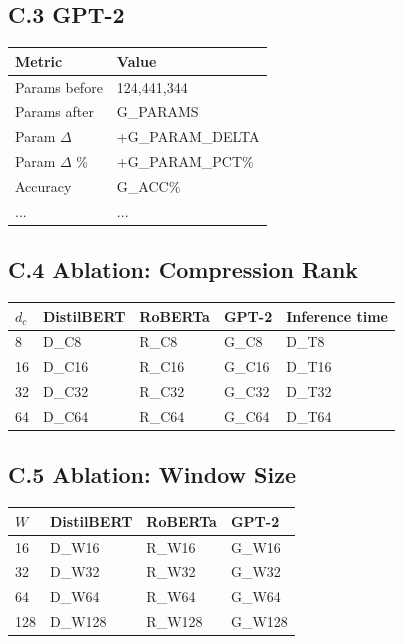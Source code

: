 \subsection{C.3 GPT-2}

\begin{table}[H]
\centering
\small
\begin{tabular}{ll}
\toprule
\textbf{Metric} & \textbf{Value} \\
\midrule
Params before & 124,441,344 \\
Params after & {{G\_PARAMS}} \\
Param $\Delta$ & +{{G\_PARAM\_DELTA}} \\
Param $\Delta$ \% & +{{G\_PARAM\_PCT}}\% \\
Accuracy & {{G\_ACC}}\% \\
... & ... \\
\bottomrule
\end{tabular}
\end{table}

\subsection{C.4 Ablation: Compression Rank}

\begin{table}[H]
\centering
\small
\begin{tabular}{lllll}
\toprule
\textbf{$d_c$} & \textbf{DistilBERT} & \textbf{RoBERTa} & \textbf{GPT-2} & \textbf{Inference time} \\
\midrule
8 & {{D\_C8}} & {{R\_C8}} & {{G\_C8}} & {{D\_T8}} \\
16 & {{D\_C16}} & {{R\_C16}} & {{G\_C16}} & {{D\_T16}} \\
32 & {{D\_C32}} & {{R\_C32}} & {{G\_C32}} & {{D\_T32}} \\
64 & {{D\_C64}} & {{R\_C64}} & {{G\_C64}} & {{D\_T64}} \\
\bottomrule
\end{tabular}
\end{table}

\subsection{C.5 Ablation: Window Size}

\begin{table}[H]
\centering
\small
\begin{tabular}{llll}
\toprule
\textbf{$W$} & \textbf{DistilBERT} & \textbf{RoBERTa} & \textbf{GPT-2} \\
\midrule
16 & {{D\_W16}} & {{R\_W16}} & {{G\_W16}} \\
32 & {{D\_W32}} & {{R\_W32}} & {{G\_W32}} \\
64 & {{D\_W64}} & {{R\_W64}} & {{G\_W64}} \\
128 & {{D\_W128}} & {{R\_W128}} & {{G\_W128}} \\
\bottomrule
\end{tabular}
\end{table}

